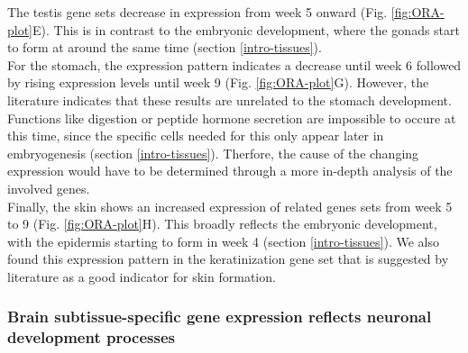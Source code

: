 \documentclass[
]{article}
\begin{document}
The testis gene sets decrease in expression from week 5 onward (Fig. \ref{fig:ORA-plot}E). This is in contrast to the embryonic development, where the gonads start to form at around the same time (section \ref{intro-tissues}).\\
For the stomach, the expression pattern indicates a decrease until week 6 followed by rising expression levels until week 9 (Fig. \ref{fig:ORA-plot}G). However, the literature indicates that these results are unrelated to the stomach development. Functions like digestion or peptide hormone secretion are impossible to occure at this time, since the specific cells needed for this only appear later in embryogenesis (section \ref{intro-tissues}). Therfore, the cause of the changing expression would have to be determined through a more in-depth analysis of the involved genes.\\
Finally, the skin shows an increased expression of related genes sets from week 5 to 9 (Fig. \ref{fig:ORA-plot}H). This broadly reflects the embryonic development, with the epidermis starting to form in week 4 (section \ref{intro-tissues}). We also found this expression pattern in the keratinization gene set that is suggested by literature as a good indicator for skin formation.

\hypertarget{dis-brain}{%
\subsubsection{Brain subtissue-specific gene expression reflects neuronal development processes}\label{dis-brain}}
\end{document}
